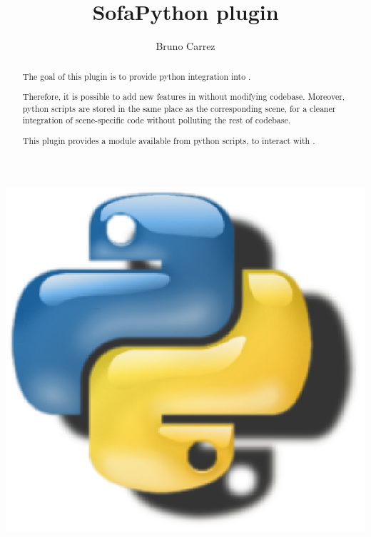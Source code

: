 \documentclass{article}
\begin{document}
\raggedright

\title{SofaPython plugin}
\author{Bruno Carrez}



\maketitle

\begin{abstract}
The goal of this plugin is to provide python integration into \sofa. 

Therefore, it is possible to add new features in \sofa without modifying \sofa codebase. Moreover, python scripts are stored in the same place as the corresponding scene, for a cleaner integration of scene-specific code without polluting the rest of \sofa codebase.

This plugin provides a  module available from python scripts, to interact with \sofa. 
\end{abstract}

\begin{center}
\includegraphics{SofaPython.eps}
\end{center}

%





\end{document}
